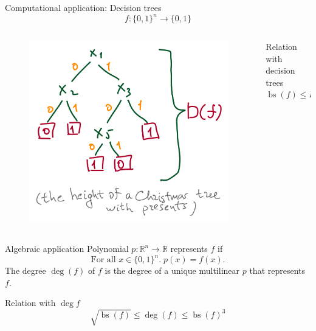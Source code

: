 \documentclass[aspectratio=169,professionalfonts]{beamer}
\DeclareMathOperator{\bs}{bs}
\DeclareMathOperator{\degr}{deg}
\newcommand{\Q}{{\{0,1\}}}
\begin{document}
\begin{frame}{Computational application: Decision trees}
    \begin{equation*}
        f\colon \Q^n \to \Q
    \end{equation*}
    \begin{columns}[T]
    \begin{column}{0.55\textwidth}%
    \vspace{-0.42in}%
    \begin{figure}
        \centering
        \includegraphics[scale=0.98]{decision_tree.png}
    \end{figure}
    \end{column}
    \begin{column}{0.45\textwidth}%
    \vspace{0.5in}%
    \begin{block}{Relation with decision trees}
    \begin{equation*}
        \bs(f) \le D(f) \le {\bs(f)}^3
    \end{equation*}
    \end{block}
    \end{column}
    \end{columns}
\end{frame}

\begin{frame}{Algebraic application}
    Polynomial $p\colon \mathbb{R}^n \to \mathbb{R}$ represents $f$ if
    \begin{equation*}
        \text{For all } x \in \Q^n.\; p(x) = f(x).
    \end{equation*}
    The degree $\degr(f)$ of $f$ is the degree of a unique multilinear $p$ that represents $f$.
    \begin{block}{Relation with $\degr{f}$}
    \begin{equation*}
        \sqrt{\bs(f)} \le \degr(f) \le {\bs(f)}^3
    \end{equation*}
    \end{block}
\end{frame}
\end{document}
